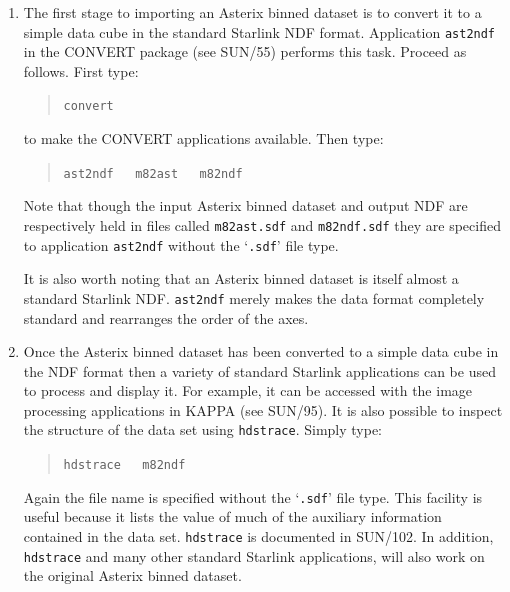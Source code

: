 \documentclass[twoside,11pt]{article}
\newcommand{\xref}[3]{#1}
\begin{document}
\begin{enumerate}

  \item The first stage to importing an Asterix binned dataset is to
   convert it to a simple data cube in the standard Starlink
   \xref{NDF}{sun33}{} format.  Application {\tt ast2ndf} in the CONVERT
   package (see \xref{SUN/55}{sun55}{}\cite{SUN55}) performs this task.
   Proceed as follows.  First type:

  \begin{quote}
   {\tt convert}
  \end{quote}

   to make the CONVERT applications available.  Then type:

  \begin{quote}
   {\tt ast2ndf ~ m82ast ~ m82ndf}
  \end{quote}

   Note that though the input Asterix binned dataset and output NDF are
   respectively
   held in files called {\tt m82ast.sdf} and {\tt m82ndf.sdf} they are
   specified to application {\tt ast2ndf} without the `{\tt .sdf}' file
   type.

   It is also worth noting that an Asterix binned dataset is itself
   almost a standard Starlink NDF.  {\tt ast2ndf} merely makes the
   data format completely standard and rearranges the order of the
   axes.

  \item Once the Asterix binned dataset has been converted to a simple
   data cube in the NDF format then a variety of standard Starlink
   applications can be used to process and display it.  For example, it
   can be accessed with the image processing applications in KAPPA (see
   \xref{SUN/95}{sun95}{}\cite{SUN95}).  It is also possible to inspect
   the structure of the data set using {\tt hdstrace}.  Simply type:

  \begin{quote}
   {\tt hdstrace ~ m82ndf}
  \end{quote}

   Again the file name is specified without the `{\tt .sdf}' file type.
   This facility is useful because it lists the value of much of the
   auxiliary information contained in the data set.  {\tt hdstrace}
   is documented in \xref{SUN/102}{sun102}{}\cite{SUN102}.  In addition,
   {\tt hdstrace} and many other standard Starlink applications, will
   also work on the original Asterix binned dataset.


\end{enumerate}
\end{document}

